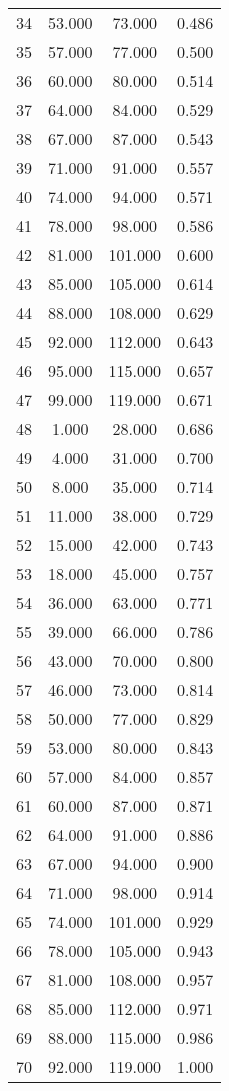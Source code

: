\begin{tabular}{cccc}
  34 & 53.000 & 73.000 & 0.486 \\ 
  35 & 57.000 & 77.000 & 0.500 \\ 
  36 & 60.000 & 80.000 & 0.514 \\ 
  37 & 64.000 & 84.000 & 0.529 \\ 
  38 & 67.000 & 87.000 & 0.543 \\ 
  39 & 71.000 & 91.000 & 0.557 \\ 
  40 & 74.000 & 94.000 & 0.571 \\ 
  41 & 78.000 & 98.000 & 0.586 \\ 
  42 & 81.000 & 101.000 & 0.600 \\ 
  43 & 85.000 & 105.000 & 0.614 \\ 
  44 & 88.000 & 108.000 & 0.629 \\ 
  45 & 92.000 & 112.000 & 0.643 \\ 
  46 & 95.000 & 115.000 & 0.657 \\ 
  47 & 99.000 & 119.000 & 0.671 \\ 
  48 & 1.000 & 28.000 & 0.686 \\ 
  49 & 4.000 & 31.000 & 0.700 \\ 
  50 & 8.000 & 35.000 & 0.714 \\ 
  51 & 11.000 & 38.000 & 0.729 \\ 
  52 & 15.000 & 42.000 & 0.743 \\ 
  53 & 18.000 & 45.000 & 0.757 \\ 
  54 & 36.000 & 63.000 & 0.771 \\ 
  55 & 39.000 & 66.000 & 0.786 \\ 
  56 & 43.000 & 70.000 & 0.800 \\ 
  57 & 46.000 & 73.000 & 0.814 \\ 
  58 & 50.000 & 77.000 & 0.829 \\ 
  59 & 53.000 & 80.000 & 0.843 \\ 
  60 & 57.000 & 84.000 & 0.857 \\ 
  61 & 60.000 & 87.000 & 0.871 \\ 
  62 & 64.000 & 91.000 & 0.886 \\ 
  63 & 67.000 & 94.000 & 0.900 \\ 
  64 & 71.000 & 98.000 & 0.914 \\ 
  65 & 74.000 & 101.000 & 0.929 \\ 
  66 & 78.000 & 105.000 & 0.943 \\ 
  67 & 81.000 & 108.000 & 0.957 \\ 
  68 & 85.000 & 112.000 & 0.971 \\ 
  69 & 88.000 & 115.000 & 0.986 \\ 
  70 & 92.000 & 119.000 & 1.000 \\ 
   \hline
\end{tabular}
